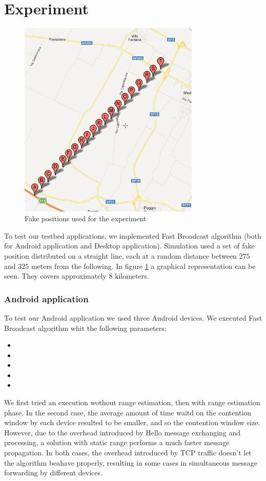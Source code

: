 \section{Experiment}
	\begin{figure}[htbp]
	\centering
	\includegraphics[width=3.4in]{imgs/punti_mappa.png}
	\caption{Fake positions used for the experiment}
	\label{fig:positions_experiment}
	\end{figure}

To test our testbed applications, we implemented Fast Broadcast algorithm (both for Android application and Desktop application). Simulation used a set of fake position distributed on a straight line, each at a random distance between $275$ and $325$ meters from the following. In figure \ref{fig:positions_experiment} a graphical representation can be seen. They covers approximately $8$ kilometers.

\subsubsection{Android application}
To test our Android application we used three Android devices. We executed Fast Broadcast algorithm whit the following parameters:

\begin{itemize}
	\item {} 
	\item {} 
	\item {}
	\item {}
	\item {}
\end{itemize}

We first tried an execution wothout range estimation, then with range estimation phase. In the second case, the average amount of time waitd on the contention window by each device resulted to be smaller, and so the contention window size. However, due to the overhead introduced by Hello message exchanging and processing, a solution with static range performs a much faster message propagation.
In both cases, the overhead introduced by TCP traffic doesn't let the algorithm beahave properly, resulting in some cases in simultaneous message forwarding by different devices.
